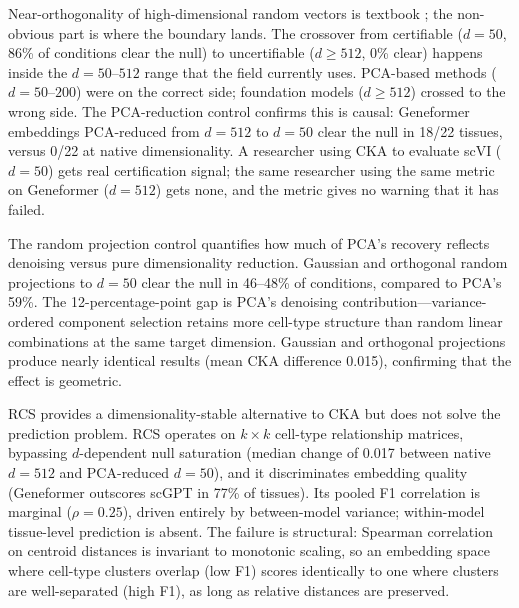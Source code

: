 \documentclass[11pt]{article}
\begin{document}
Near-orthogonality of high-dimensional random vectors is textbook
\citep{johnsonlindenstrauss1984}; the non-obvious part is where the
boundary lands. The crossover from certifiable ($d = 50$, 86\% of
conditions clear the null) to uncertifiable ($d \geq 512$, 0\% clear)
happens inside the $d = 50$--$512$ range that the field currently uses.
PCA-based methods ($d = 50$--$200$) were on the correct side; foundation
models ($d \geq 512$) crossed to the wrong side. The PCA-reduction
control confirms this is causal: Geneformer embeddings PCA-reduced from
$d = 512$ to $d = 50$ clear the null in 18/22 tissues, versus 0/22 at
native dimensionality. A researcher using CKA to evaluate scVI
($d = 50$) gets real certification signal; the same researcher using the
same metric on Geneformer ($d = 512$) gets none, and the metric gives no
warning that it has failed.

The random projection control quantifies how much of PCA's recovery
reflects denoising versus pure dimensionality reduction. Gaussian and
orthogonal random projections to $d = 50$ clear the null in 46--48\%
of conditions, compared to PCA's 59\%. The 12-percentage-point gap is
PCA's denoising contribution---variance-ordered component selection
retains more cell-type structure than random linear combinations at
the same target dimension. Gaussian and orthogonal projections produce
nearly identical results (mean CKA difference 0.015), confirming that
the effect is geometric.

RCS provides a dimensionality-stable alternative to CKA but does not
solve the prediction problem. RCS operates on $k \times k$ cell-type
relationship matrices, bypassing $d$-dependent null saturation (median
change of 0.017 between native $d = 512$ and PCA-reduced $d = 50$),
and it discriminates embedding quality (Geneformer outscores scGPT in
77\% of tissues). Its pooled F1 correlation is marginal
($\rho = 0.25$), driven entirely by between-model variance; within-model
tissue-level prediction is absent. The failure is structural: Spearman
correlation on centroid distances is invariant to monotonic scaling, so
an embedding space where cell-type clusters overlap (low F1) scores
identically to one where clusters are well-separated (high F1), as long
as relative distances are preserved.
\end{document}
